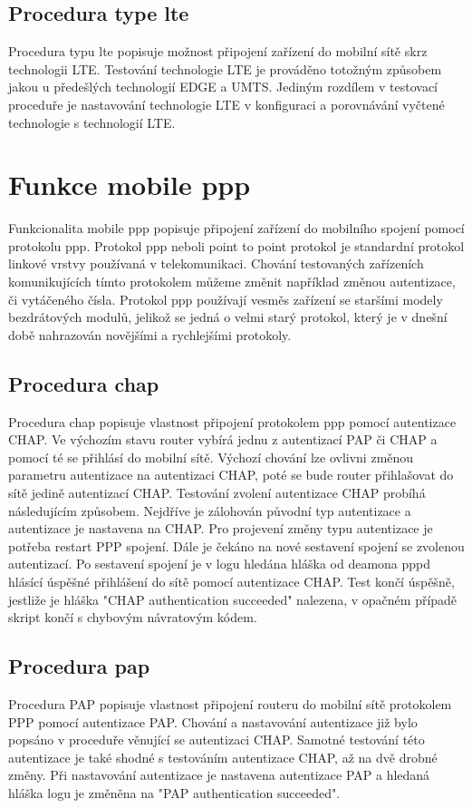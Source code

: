 \subsection{Procedura type lte}
Procedura typu lte popisuje možnost připojení zařízení do mobilní sítě skrz technologii LTE. Testování technologie LTE je prováděno totožným způsobem jakou u předešlých technologií EDGE a UMTS. Jediným rozdílem v testovací proceduře je nastavování technologie LTE v konfiguraci a porovnávání vyčtené technologie s technologií LTE.

\section{Funkce mobile ppp}
Funkcionalita mobile ppp popisuje připojení zařízení do mobilního spojení pomocí protokolu ppp. Protokol ppp neboli point to point protokol je standardní protokol linkové vrstvy používaná v telekomunikaci. Chování testovaných zařízeních komunikujících tímto protokolem můžeme změnit například změnou autentizace, či vytáčeného čísla. Protokol ppp používají vesměs zařízení se staršími modely bezdrátových modulů, jelikož se jedná o velmi starý protokol, který je v dnešní době nahrazován novějšími a rychlejšími protokoly.

\subsection{Procedura chap}
Procedura chap popisuje vlastnost připojení protokolem ppp pomocí autentizace CHAP. Ve výchozím stavu router vybírá jednu z autentizací PAP či CHAP a pomocí té se přihlásí do mobilní sítě. Výchozí chování lze ovlivni změnou parametru autentizace na autentizaci CHAP, poté se bude router přihlašovat do sítě jedině autentizací CHAP. Testování zvolení autentizace CHAP probíhá následujícím způsobem. Nejdříve je zálohován původní typ autentizace a autentizace je nastavena na CHAP. Pro projevení změny typu autentizace je potřeba restart PPP spojení. Dále je čekáno na nové sestavení spojení se zvolenou autentizací. Po sestavení spojení je v logu hledána hláška od deamona pppd hlásící úspěšné přihlášení do sítě pomocí autentizace CHAP. Test končí úspěšně, jestliže je hláška "CHAP authentication succeeded" nalezena, v opačném případě skript končí s chybovým návratovým kódem.

\subsection{Procedura pap}
Procedura PAP popisuje vlastnost připojení routeru do mobilní sítě protokolem PPP pomocí autentizace PAP. Chování a nastavování autentizace již bylo popsáno v proceduře věnující se autentizaci CHAP. Samotné testování této autentizace je také shodné s testováním autentizace CHAP, až na dvě drobné změny. Při nastavování autentizace je nastavena autentizace PAP a hledaná hláška logu je změněna na "PAP authentication succeeded".

